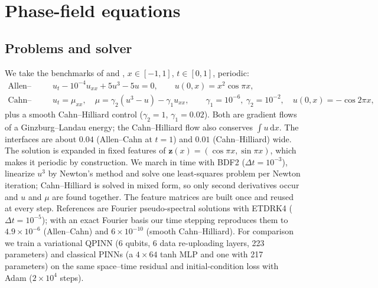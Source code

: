 \documentclass[11pt]{article}
\theoremstyle{remark}\newtheorem*{remark}{Remark}
\begin{document}
\section{Phase-field equations}\label{sec:pf}
\subsection{Problems and solver}
We take the benchmarks of \citet{raissi2019pinn} and \citet{wight2021adaptive}, $x\in[-1,1]$, $t\in[0,1]$, periodic:
\begin{align}
  \text{Allen--Cahn:}\quad & u_t-10^{-4}u_{xx}+5u^3-5u=0,\qquad u(0,x)=x^2\cos\pi x,\\
  \text{Cahn--Hilliard:}\quad & u_t=\mu_{xx},\quad \mu=\gamma_2(u^3-u)-\gamma_1u_{xx},\qquad
  \gamma_1=10^{-6},\ \gamma_2=10^{-2},\quad u(0,x)=-\cos2\pi x,
\end{align}
plus a smooth Cahn--Hilliard control ($\gamma_2=1$, $\gamma_1=0.02$). Both are gradient flows of a Ginzburg--Landau
energy; the Cahn--Hilliard flow also conserves $\int u\,\mathrm dx$. The interfaces are about $0.04$ (Allen--Cahn at
$t=1$) and $0.01$ (Cahn--Hilliard) wide.
The solution is expanded in fixed features of $\bm z(x)=(\cos\pi x,\sin\pi x)$, which makes it periodic by
construction. We march in time with BDF2 ($\Delta t=10^{-3}$), linearize $u^3$ by Newton's method and solve one
least-squares problem per Newton iteration; Cahn--Hilliard is solved in mixed form, so only second derivatives occur
and $u$ and $\mu$ are found together. The feature matrices are built once and reused at every step.
References are Fourier pseudo-spectral solutions with ETDRK4 ($\Delta t=10^{-5}$); with an exact Fourier basis our time
stepping reproduces them to $4.9\times10^{-6}$ (Allen--Cahn) and $6\times10^{-10}$ (smooth Cahn--Hilliard).
For comparison we train a variational QPINN (6 qubits, 6 data re-uploading layers, 223 parameters) and classical PINNs
(a $4\times64$ tanh MLP and one with 217 parameters) on the same space--time residual and initial-condition loss with
Adam ($2\times10^4$ steps).
\end{document}
